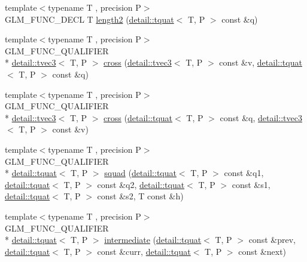\begin{DoxyCompactItemize}
\item 
{\footnotesize template$<$typename T , precision P$>$ }\\G\-L\-M\-\_\-\-F\-U\-N\-C\-\_\-\-D\-E\-C\-L T \hyperlink{group__gtx__quaternion_gaac8d704c7dfac92835109953b88f1c92}{length2} (\hyperlink{structglm_1_1detail_1_1tquat}{detail\-::tquat}$<$ T, P $>$ const \&q)
\item 
{\footnotesize template$<$typename T , precision P$>$ }\\G\-L\-M\-\_\-\-F\-U\-N\-C\-\_\-\-Q\-U\-A\-L\-I\-F\-I\-E\-R \\*
\hyperlink{structglm_1_1detail_1_1tvec3}{detail\-::tvec3}$<$ T, P $>$ \hyperlink{group__gtx__quaternion_ga7794f940ba271ff846ea706204b0259a}{cross} (\hyperlink{structglm_1_1detail_1_1tvec3}{detail\-::tvec3}$<$ T, P $>$ const \&v, \hyperlink{structglm_1_1detail_1_1tquat}{detail\-::tquat}$<$ T, P $>$ const \&q)
\item 
{\footnotesize template$<$typename T , precision P$>$ }\\G\-L\-M\-\_\-\-F\-U\-N\-C\-\_\-\-Q\-U\-A\-L\-I\-F\-I\-E\-R \\*
\hyperlink{structglm_1_1detail_1_1tvec3}{detail\-::tvec3}$<$ T, P $>$ \hyperlink{group__gtx__quaternion_ga8b5c3ff869c773f26d0a562dfcd3f9e4}{cross} (\hyperlink{structglm_1_1detail_1_1tquat}{detail\-::tquat}$<$ T, P $>$ const \&q, \hyperlink{structglm_1_1detail_1_1tvec3}{detail\-::tvec3}$<$ T, P $>$ const \&v)
\item 
{\footnotesize template$<$typename T , precision P$>$ }\\G\-L\-M\-\_\-\-F\-U\-N\-C\-\_\-\-Q\-U\-A\-L\-I\-F\-I\-E\-R \\*
\hyperlink{structglm_1_1detail_1_1tquat}{detail\-::tquat}$<$ T, P $>$ \hyperlink{group__gtx__quaternion_ga5e756a5817856a3d69f0974fac8322e2}{squad} (\hyperlink{structglm_1_1detail_1_1tquat}{detail\-::tquat}$<$ T, P $>$ const \&q1, \hyperlink{structglm_1_1detail_1_1tquat}{detail\-::tquat}$<$ T, P $>$ const \&q2, \hyperlink{structglm_1_1detail_1_1tquat}{detail\-::tquat}$<$ T, P $>$ const \&s1, \hyperlink{structglm_1_1detail_1_1tquat}{detail\-::tquat}$<$ T, P $>$ const \&s2, T const \&h)
\item 
{\footnotesize template$<$typename T , precision P$>$ }\\G\-L\-M\-\_\-\-F\-U\-N\-C\-\_\-\-Q\-U\-A\-L\-I\-F\-I\-E\-R \\*
\hyperlink{structglm_1_1detail_1_1tquat}{detail\-::tquat}$<$ T, P $>$ \hyperlink{group__gtx__quaternion_ga96cb50103d939ea50d8b80bc898b2a35}{intermediate} (\hyperlink{structglm_1_1detail_1_1tquat}{detail\-::tquat}$<$ T, P $>$ const \&prev, \hyperlink{structglm_1_1detail_1_1tquat}{detail\-::tquat}$<$ T, P $>$ const \&curr, \hyperlink{structglm_1_1detail_1_1tquat}{detail\-::tquat}$<$ T, P $>$ const \&next)

\end{DoxyCompactItemize}
